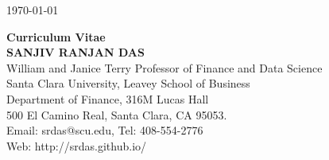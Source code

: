\documentclass{article}
\begin{document}

\begin{center}

\today

{\bf Curriculum Vitae \\[0.4cm]
SANJIV RANJAN DAS} \\[0.6cm]

     William and Janice Terry Professor of Finance and Data Science\\
        Santa Clara University, 
        Leavey School of Business\\
        Department of Finance, 316M Lucas Hall\\
        500 El Camino Real, 
        Santa Clara, CA 95053.\\
        Email: srdas@scu.edu, Tel: 408-554-2776\\
        Web: http://srdas.github.io/




\end{center}

\end{document}
